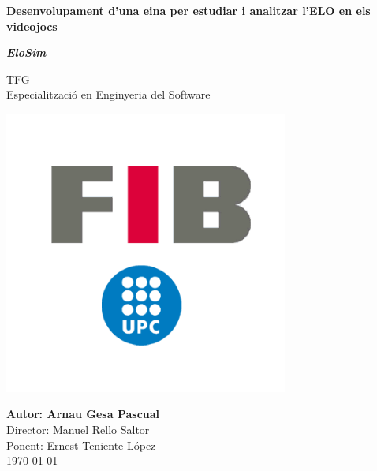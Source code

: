 \begin{titlepage}
    \begin{center}
            
        \Huge
        \textbf{Desenvolupament d'una eina per estudiar i analitzar l'ELO en els videojocs}
        
        \vspace{0.5cm}
        
        \textbf{\textit{EloSim}}
            
        \vspace{0.5cm}
        \Large
        TFG\\
        Especialització en Enginyeria del Software
            
        \vspace{0.3cm}    
            
        \includegraphics[width=0.7\textwidth]{images/logo-fib.png}
            
        \vfill
        \Large
        \textbf{Autor: Arnau Gesa Pascual}\\
        Director: Manuel Rello Saltor\\
        Ponent: Ernest Teniente López\\
        \today\\
            
    \end{center}
\end{titlepage}